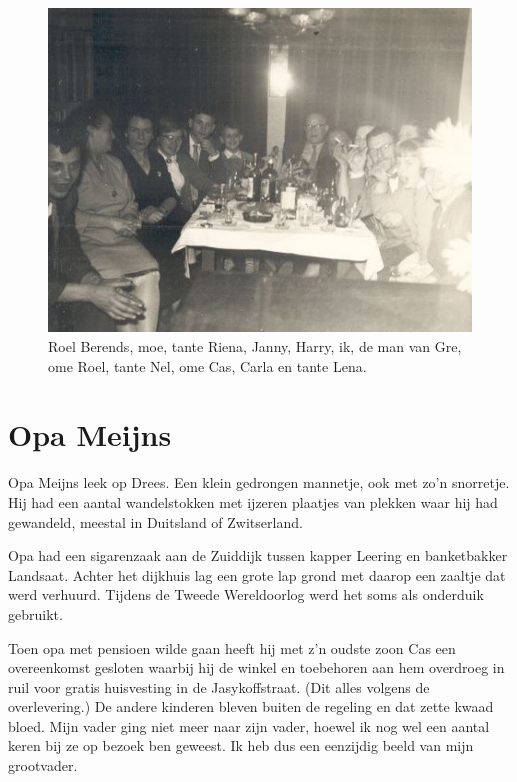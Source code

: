 \documentclass[12pt,twoside]{memoir}
\begin{document}
\begin{figure}[t]
\includegraphics[width=\textwidth]{img/ch1/oudnieuw}
\caption*{\footnotesize Roel Berends, moe, tante Riena, Janny, Harry, ik, de man van Gre, ome Roel, tante Nel, ome Cas, Carla en tante Lena.}
\end{figure} 

\chapter{Opa Meijns} %
\label{cha:opa_meijns}

Opa Meijns leek op Drees. Een klein gedrongen mannetje, ook met zo’n snorretje. Hij had een aantal wandelstokken met ijzeren plaatjes van plekken waar hij had gewandeld, meestal in Duitsland of Zwitserland.

Opa had een sigarenzaak aan de Zuiddijk tussen kapper Leering en banketbakker Landsaat. Achter het dijkhuis lag een grote lap grond met daarop een zaaltje dat werd verhuurd. Tijdens de Tweede Wereldoorlog werd het soms als onderduik gebruikt. 

Toen opa met pensioen wilde gaan heeft hij met z’n oudste zoon Cas een overeenkomst gesloten waarbij hij de winkel en toebehoren aan hem overdroeg in ruil voor gratis huisvesting in de Jasykoffstraat. (Dit alles volgens de overlevering.) De andere kinderen bleven buiten de regeling en dat zette kwaad bloed. Mijn vader ging niet meer naar zijn vader, hoewel ik nog wel een aantal keren bij ze op bezoek ben geweest. Ik heb dus een eenzijdig beeld van mijn grootvader.
\end{document}
